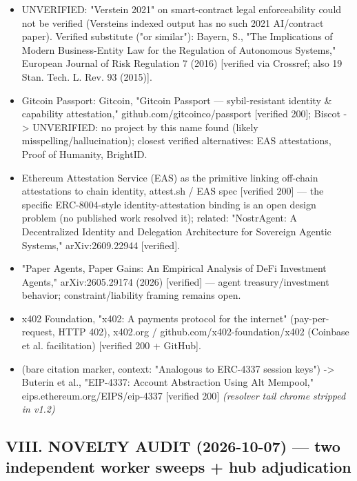 \documentclass[
]{article}
\begin{document}
\begin{itemize}
  GitHub) {[}verified 200{]}.
\item
  UNVERIFIED: "Verstein 2021" on smart-contract legal enforceability
  could not be verified (Verstein\textquotesingle s indexed output has
  no such 2021 AI/contract paper). Verified substitute ("or similar"):
  Bayern, S., "The Implications of Modern Business-Entity Law for the
  Regulation of Autonomous Systems," European Journal of Risk Regulation
  7 (2016) {[}verified via Crossref; also 19 Stan. Tech. L. Rev. 93
  (2015){]}.
\item
  Gitcoin Passport: Gitcoin, "Gitcoin Passport --- sybil-resistant
  identity \& capability attestation," github.com/gitcoinco/passport
  {[}verified 200{]}; Biscot -\textgreater{} UNVERIFIED: no project by
  this name found (likely misspelling/hallucination); closest verified
  alternatives: EAS attestations, Proof of Humanity, BrightID.
\item
  Ethereum Attestation Service (EAS) as the primitive linking off-chain
  attestations to chain identity, attest.sh / EAS spec {[}verified
  200{]} --- the specific ERC-8004-style identity-attestation binding is
  an open design problem (no published work resolved it); related:
  "NostrAgent: A Decentralized Identity and Delegation Architecture for
  Sovereign Agentic Systems," arXiv:2609.22944 {[}verified{]}.
\item
  "Paper Agents, Paper Gains: An Empirical Analysis of DeFi Investment
  Agents," arXiv:2605.29174 (2026) {[}verified{]} --- agent
  treasury/investment behavior; constraint/liability framing remains
  open.
\item
  x402 Foundation, "x402: A payments protocol for the internet"
  (pay-per-request, HTTP 402), x402.org /
  github.com/x402-foundation/x402 (Coinbase et al. facilitation)
  {[}verified 200 + GitHub{]}.
\item
  (bare citation marker, context: "Analogous to ERC-4337 session keys")
  -\textgreater{} Buterin et al., "EIP-4337: Account Abstraction Using
  Alt Mempool," eips.ethereum.org/EIPS/eip-4337 {[}verified 200{]}
  \emph{(resolver tail chrome stripped in v1.2)}
\end{itemize}

\subsection{VIII. NOVELTY AUDIT (2026-10-07) --- two independent worker
sweeps + hub
adjudication}\label{viii-novelty-audit-2026-10-07--two-independent-worker-sweeps--hub-adjudication}
\end{document}
